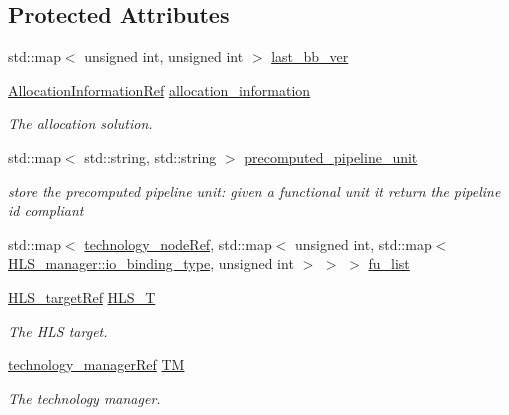 \subsection*{Protected Attributes}
\begin{DoxyCompactItemize}
\item 
std\+::map$<$ unsigned int, unsigned int $>$ \hyperlink{classallocation_a9e3e786dd1b209a63a42894a4fb365f1}{last\+\_\+bb\+\_\+ver}
\item 
\hyperlink{allocation__information_8hpp_ad90a86da153cba50cbcefc4679036755}{Allocation\+Information\+Ref} \hyperlink{classallocation_a6f1b3fd4ce46389216d316e91fd5e3ff}{allocation\+\_\+information}
\begin{DoxyCompactList}\small\item\em The allocation solution. \end{DoxyCompactList}\item 
std\+::map$<$ std\+::string, std\+::string $>$ \hyperlink{classallocation_a6da9ffbc83498fadfa6755b0e192d712}{precomputed\+\_\+pipeline\+\_\+unit}
\begin{DoxyCompactList}\small\item\em store the precomputed pipeline unit\+: given a functional unit it return the pipeline id compliant \end{DoxyCompactList}\item 
std\+::map$<$ \hyperlink{technology__node_8hpp_a33dd193b7bd6b987bf0d8a770a819fa7}{technology\+\_\+node\+Ref}, std\+::map$<$ unsigned int, std\+::map$<$ \hyperlink{classHLS__manager_a972627cc658afa992590b9d2bf1a1e87}{H\+L\+S\+\_\+manager\+::io\+\_\+binding\+\_\+type}, unsigned int $>$ $>$ $>$ \hyperlink{classallocation_abb3dd63c5df7f47db4f56a5b88e643bf}{fu\+\_\+list}
\item 
\hyperlink{hls__target_8hpp_a390f1d55d3b31739665ff2776abe2a3f}{H\+L\+S\+\_\+target\+Ref} \hyperlink{classallocation_a27ad1d8608f43abd9b719988ddb5095c}{H\+L\+S\+\_\+T}
\begin{DoxyCompactList}\small\item\em The H\+LS target. \end{DoxyCompactList}\item 
\hyperlink{technology__manager_8hpp_a4b9ecd440c804109c962654f9227244e}{technology\+\_\+manager\+Ref} \hyperlink{classallocation_a4d459a70dabbb13058a43f912edcfe93}{TM}
\begin{DoxyCompactList}\small\item\em The technology manager. \end{DoxyCompactList}\end{DoxyCompactItemize}
